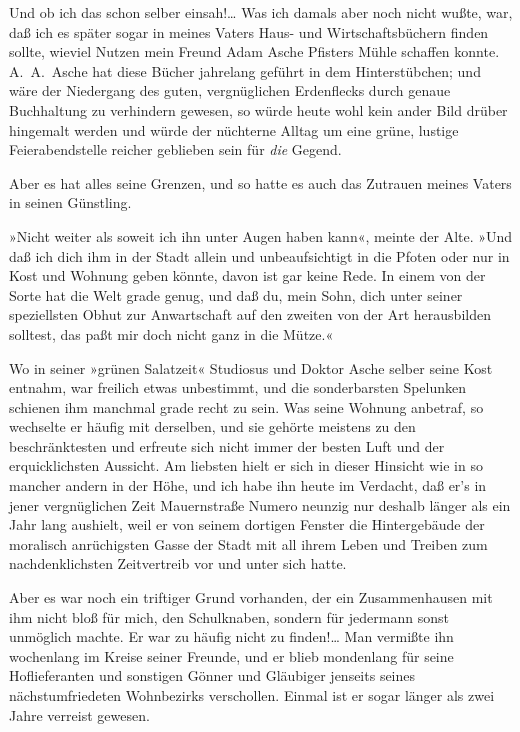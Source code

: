 Und ob ich das schon selber einsah!\ldots{} Was ich damals aber noch
nicht wußte, war, daß ich es später sogar in meines Vaters Haus-
und Wirtschaftsbüchern finden sollte, wieviel Nutzen mein Freund
Adam Asche Pfisters Mühle schaffen konnte. A.~A.~Asche hat diese
Bücher jahrelang geführt in dem Hinterstübchen; und wäre der
Niedergang des guten, vergnüglichen Erdenflecks durch genaue
Buchhaltung zu verhindern gewesen, so würde heute wohl kein ander
Bild drüber hingemalt werden und würde der nüchterne Alltag um eine
grüne, lustige Feierabendstelle reicher geblieben sein für
\emph{die} Gegend.

Aber es hat alles seine Grenzen, und so hatte es auch das Zutrauen
meines Vaters in seinen Günstling.

»Nicht weiter als soweit ich ihn unter Augen haben kann«, meinte
der Alte. »Und daß ich dich ihm in der Stadt allein und
unbeaufsichtigt in die Pfoten oder nur in Kost und Wohnung geben
könnte, davon ist gar keine Rede. In einem von der Sorte hat die
Welt grade genug, und daß du, mein Sohn, dich unter seiner
speziellsten Obhut zur Anwartschaft auf den zweiten von der Art
herausbilden solltest, das paßt mir doch nicht ganz in die Mütze.«

Wo in seiner »grünen Salatzeit« Studiosus und Doktor Asche selber
seine Kost entnahm, war freilich etwas unbestimmt, und die
sonderbarsten Spelunken schienen ihm manchmal grade recht zu sein.
Was seine Wohnung anbetraf, so wechselte er häufig mit derselben,
und sie gehörte meistens zu den beschränktesten und erfreute sich
nicht immer der besten Luft und der erquicklichsten Aussicht. Am
liebsten hielt er sich in dieser Hinsicht wie in so mancher andern
in der Höhe, und ich habe ihn heute im Verdacht, daß er's in jener
vergnüglichen Zeit Mauernstraße Numero neunzig nur deshalb länger
als ein Jahr lang aushielt, weil er von seinem dortigen Fenster die
Hintergebäude der moralisch anrüchigsten Gasse der Stadt mit all
ihrem Leben und Treiben zum nachdenklichsten Zeitvertreib vor und
unter sich hatte.

Aber es war noch ein triftiger Grund vorhanden, der ein
Zusammenhausen mit ihm nicht bloß für mich, den Schulknaben,
sondern für jedermann sonst unmöglich machte. Er war zu häufig
nicht zu finden!\ldots{} Man vermißte ihn wochenlang im Kreise seiner
Freunde, und er blieb mondenlang für seine Hoflieferanten und
sonstigen Gönner und Gläubiger jenseits seines nächstumfriedeten
Wohnbezirks verschollen. Einmal ist er sogar länger als zwei Jahre
verreist gewesen.

